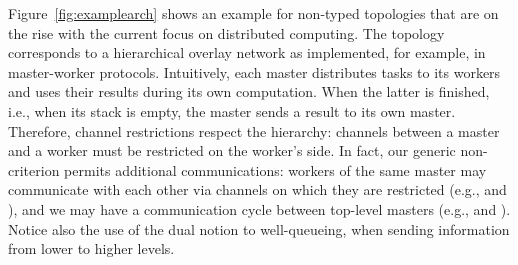 \documentclass{LMCS}
\begin{document}
Figure~\ref{fig:examplearch} shows an example for non-\converging typed
topologies that are on the rise with the current focus on distributed
computing. The topology corresponds to a hierarchical overlay network as
implemented, for example, in master-worker protocols.
Intuitively, each master distributes tasks to its workers and uses their
results during its own computation.
When the latter is finished, i.e., when its stack is empty, the master
sends a result to its own master.
Therefore, channel restrictions respect the hierarchy: channels between
a master and a worker must be restricted on the worker's side.
In fact, our generic non-\convergence criterion permits additional
communications: workers of the same master may communicate
with each other via channels on which they are restricted (e.g.,
 and ),
and we may have a communication cycle between top-level masters
(e.g.,  and ).
Notice also the use of the dual notion to well-queueing, when
sending information from lower to higher
levels. 
\end{document}
